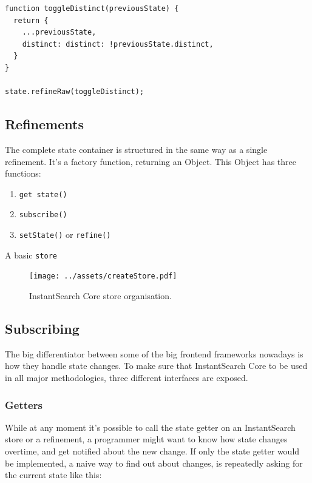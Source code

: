 \begin{minipage}{\linewidth}
\begin{lstlisting}[caption={Toggling the {\tt DISTINCT} parameter when Object spread is available},label={lst:is-core-raw}]
function toggleDistinct(previousState) {
  return {
    ...previousState,
    distinct: distinct: !previousState.distinct,
  }
}

state.refineRaw(toggleDistinct);
\end{lstlisting}
\end{minipage}

\subsection{Refinements}
\label{ssec:refinments}

The complete state container is structured in the same way as a single refinement. It's a factory function, returning an Object. This Object has three functions: 

\begin{enumerate}
  \item {\tt get state()}
  \item {\tt subscribe()}
  \item {\tt setState()} or {\tt refine()}
\end{enumerate}

A basic {\tt store}

\begin{figure}[H]
  \centering
  \texttt{[image: ../assets/createStore.pdf]}
  \caption{InstantSearch Core store organisation.}
  \label{figure:createstore_inheritance}
\end{figure}

\subsection{Subscribing}
\label{ssec:Subscribing}

The big differentiator between some of the big frontend frameworks nowadays is how they handle state changes. To make sure that InstantSearch Core to be used in all major methodologies, three different interfaces are exposed.

\subsubsection{Getters}
\label{ssub:getters}

While at any moment it's possible to call the state getter on an InstantSearch store or a refinement, a programmer might want to know how state changes overtime, and get notified about the new change. If only the state getter would be implemented, a naive way to find out about changes, is repeatedly asking for the current state like this:

